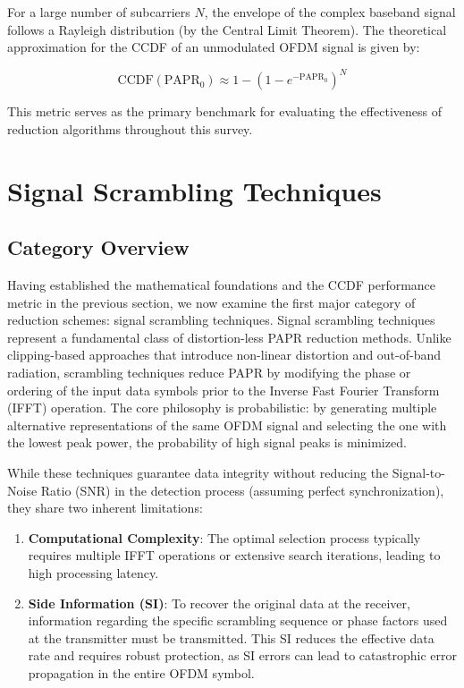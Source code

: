 \documentclass[conference]{IEEEtran}
\begin{document}
For a large number of subcarriers $N$, the envelope of the complex baseband signal follows a Rayleigh distribution (by the Central Limit Theorem). The theoretical approximation for the CCDF of an unmodulated OFDM signal is given by:

\begin{equation}
    \text{CCDF}(\text{PAPR}_0) \approx 1 - (1 - e^{-\text{PAPR}_0})^N
\end{equation}

This metric serves as the primary benchmark for evaluating the effectiveness of reduction algorithms throughout this survey.

\section{Signal Scrambling Techniques}

\subsection{Category Overview}
Having established the mathematical foundations and the CCDF performance metric in the previous section, we now examine the first major category of reduction schemes: signal scrambling techniques. Signal scrambling techniques represent a fundamental class of distortion-less PAPR reduction methods. Unlike clipping-based approaches that introduce non-linear distortion and out-of-band radiation, scrambling techniques reduce PAPR by modifying the phase or ordering of the input data symbols prior to the Inverse Fast Fourier Transform (IFFT) operation. The core philosophy is probabilistic: by generating multiple alternative representations of the same OFDM signal and selecting the one with the lowest peak power, the probability of high signal peaks is minimized.

While these techniques guarantee data integrity without reducing the Signal-to-Noise Ratio (SNR) in the detection process (assuming perfect synchronization), they share two inherent limitations:

\begin{enumerate}
    \item \textbf{Computational Complexity}: The optimal selection process typically requires multiple IFFT operations or extensive search iterations, leading to high processing latency.
    \item \textbf{Side Information (SI)}: To recover the original data at the receiver, information regarding the specific scrambling sequence or phase factors used at the transmitter must be transmitted. This SI reduces the effective data rate and requires robust protection, as SI errors can lead to catastrophic error propagation in the entire OFDM symbol.
\end{enumerate}
\end{document}
